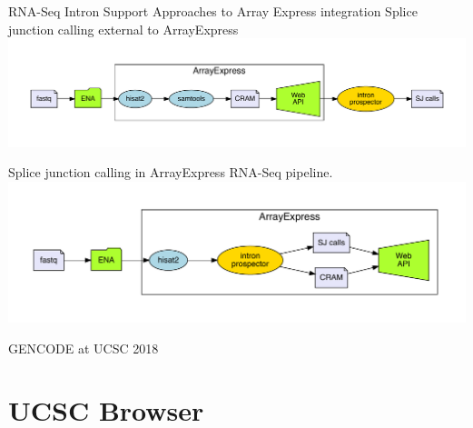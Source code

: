 \documentclass[10pt,
               hyperref={bookmarks=false,
                         bookmarksopen=false,
                         colorlinks=true,
                         linkcolor=blue,
                         urlcolor=blue},
               xcolor={svgnames,table}]{beamer}
\newcommand{\sectionframe}[1]{
  \begin{frame}{GENCODE at UCSC 2018}
    \section{#1}
  \end{frame}
}
\begin{document}
\begin{frame}{RNA-Seq Intron Support}
  Approaches to Array Express integration
  \centering
  Splice junction calling external to ArrayExpress
  \includegraphics[scale=0.42]{images/calling_external.pdf}

  Splice junction calling in ArrayExpress RNA-Seq pipeline.
  \includegraphics[scale=0.42]{images/calling_at_array_express.pdf}
\end{frame}

\sectionframe{UCSC Browser}

\end{document}
